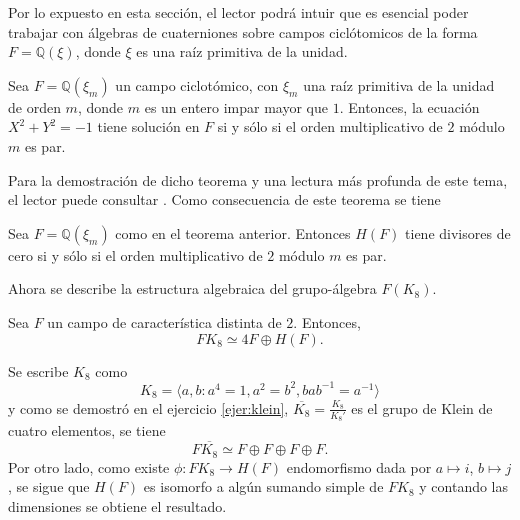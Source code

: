 Por lo expuesto en esta sección, el lector podrá intuir que es esencial poder trabajar con álgebras de cuaterniones sobre campos ciclótomicos de la forma $F = \mathds{Q}(\xi)$, donde $\xi$ es una raíz primitiva de la unidad. 

\begin{teorema}
Sea $F = \mathds{Q}(\xi_m)$ un campo ciclotómico, con $\xi_m$ una raíz primitiva de la unidad de orden $m$, donde $m$ es un entero impar mayor que $1$. Entonces, la ecuación $X^2 + Y^2 = -1$ tiene solución en $F$ si y sólo si el orden multiplicativo de $2$ módulo $m$ es par.
\end{teorema}

Para la demostración de dicho teorema y una lectura más profunda de este tema, el lector puede consultar \cite{bib:moser}. Como consecuencia de este teorema se tiene
\begin{lema}
Sea $F = \mathds{Q}(\xi_m)$ como en el teorema anterior. Entonces $H(F)$ tiene divisores de cero si y sólo si el orden multiplicativo de $2$ módulo $m$ es par.
\end{lema}

Ahora se describe la estructura algebraica del grupo-álgebra $F(K_8)$.

\begin{lema}\label{lem:K8}
Sea $F$ un campo de característica distinta de $2 $. Entonces,
\begin{equation*}
FK_8 \simeq 4F\oplus H(F).
\end{equation*}
\end{lema}
\begin{proof*}
Se escribe $K_8$ como
\begin{equation*}
K_8 = \langle a, b \colon a^4 = 1, a^2 = b^2, bab^{-1} = a^{-1} \rangle
\end{equation*}
y como se demostró en el ejercicio \ref{ejer:klein}, $\overline{K_8} = \frac{K_8}{K_8'}$ es el grupo de Klein de cuatro elementos, se tiene
\begin{equation*}
F\overline{K_8} \simeq F \oplus F \oplus F \oplus F.
\end{equation*}
\indent Por otro lado, como existe $\phi \colon FK_8 \to H(F)$ endomorfismo dada por $a \mapsto i$, $b \mapsto j$, se sigue que $H(F)$ es isomorfo a algún sumando simple de $FK_8$ y contando las dimensiones se obtiene el resultado. 
\end{proof*}


